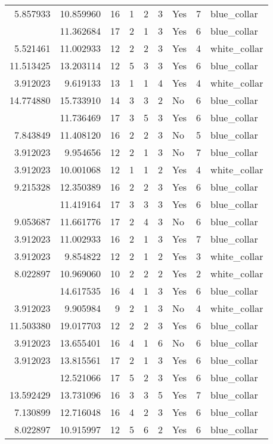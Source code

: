 \documentclass[
]{article}
\begin{document}
\begin{longtable}[t]{rrrrrllrl}
5.857933 & 10.859960 & 16 & 1 & 2 & 3 & Yes & 7 & blue\_collar\\
\addlinespace
3.912023 & 11.362684 & 17 & 2 & 1 & 3 & Yes & 6 & blue\_collar\\
5.521461 & 11.002933 & 12 & 2 & 2 & 3 & Yes & 4 & white\_collar\\
11.513425 & 13.203114 & 12 & 5 & 3 & 3 & Yes & 6 & blue\_collar\\
3.912023 & 9.619133 & 13 & 1 & 1 & 4 & Yes & 4 & white\_collar\\
14.774880 & 15.733910 & 14 & 3 & 3 & 2 & No & 6 & blue\_collar\\
\addlinespace
10.375053 & 11.736469 & 17 & 3 & 5 & 3 & Yes & 6 & blue\_collar\\
7.843849 & 11.408120 & 16 & 2 & 2 & 3 & No & 5 & blue\_collar\\
3.912023 & 9.954656 & 12 & 2 & 1 & 3 & No & 7 & blue\_collar\\
3.912023 & 10.001068 & 12 & 1 & 1 & 2 & Yes & 4 & white\_collar\\
9.215328 & 12.350389 & 16 & 2 & 2 & 3 & Yes & 6 & blue\_collar\\
\addlinespace
8.022897 & 11.419164 & 17 & 3 & 3 & 3 & Yes & 6 & blue\_collar\\
9.053687 & 11.661776 & 17 & 2 & 4 & 3 & No & 6 & blue\_collar\\
3.912023 & 11.002933 & 16 & 2 & 1 & 3 & Yes & 7 & blue\_collar\\
3.912023 & 9.854822 & 12 & 2 & 1 & 2 & Yes & 3 & white\_collar\\
8.022897 & 10.969060 & 10 & 2 & 2 & 2 & Yes & 2 & white\_collar\\
\addlinespace
3.912023 & 14.617535 & 16 & 4 & 1 & 3 & Yes & 6 & blue\_collar\\
3.912023 & 9.905984 & 9 & 2 & 1 & 3 & No & 4 & white\_collar\\
11.503380 & 19.017703 & 12 & 2 & 2 & 3 & Yes & 6 & blue\_collar\\
3.912023 & 13.655401 & 16 & 4 & 1 & 6 & No & 6 & blue\_collar\\
3.912023 & 13.815561 & 17 & 2 & 1 & 3 & Yes & 6 & blue\_collar\\
\addlinespace
10.205442 & 12.521066 & 17 & 5 & 2 & 3 & Yes & 6 & blue\_collar\\
13.592429 & 13.731096 & 16 & 3 & 3 & 5 & Yes & 7 & blue\_collar\\
7.130899 & 12.716048 & 16 & 4 & 2 & 3 & Yes & 6 & blue\_collar\\
8.022897 & 10.915997 & 12 & 5 & 6 & 2 & Yes & 6 & blue\_collar\\

\end{longtable}
\end{document}
